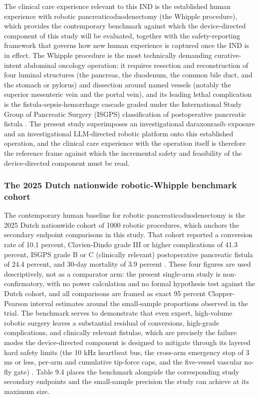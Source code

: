 The clinical care experience relevant to this IND is the established human
experience with robotic pancreaticoduodenectomy (the Whipple procedure), which
provides the contemporary benchmark against which the device-directed component of
this study will be evaluated, together with the safety-reporting framework that
governs how new human experience is captured once the IND is in effect. The
Whipple procedure is the most technically demanding curative-intent abdominal
oncology operation: it requires resection and reconstruction of four luminal
structures (the pancreas, the duodenum, the common bile duct, and the stomach or
pylorus) and dissection around named vessels (notably the superior mesenteric vein
and the portal vein), and its leading lethal complication is the
fistula-sepsis-hemorrhage cascade graded under the International Study Group of
Pancreatic Surgery (ISGPS) classification of postoperative pancreatic fistula
\cite{onpremwhippl}. The present study superimposes an investigational
daraxonrasib exposure and an investigational LLM-directed robotic platform onto
this established operation, and the clinical care experience with the operation
itself is therefore the reference frame against which the incremental safety and
feasibility of the device-directed component must be read.

\subsubsection*{The 2025 Dutch nationwide robotic-Whipple benchmark cohort}

The contemporary human baseline for robotic pancreaticoduodenectomy is the 2025
Dutch nationwide cohort of 1000 robotic procedures, which anchors the secondary
endpoint comparisons in this study. That cohort reported a conversion rate of 10.1
percent, Clavien-Dindo grade III or higher complications of 41.3 percent, ISGPS
grade B or C (clinically relevant) postoperative pancreatic fistula of 24.4
percent, and 30-day mortality of 3.9 percent \cite{onpremwhippl}. These four
figures are used descriptively, not as a comparator arm: the present single-arm
study is non-confirmatory, with no power calculation and no formal hypothesis test
against the Dutch cohort, and all comparisons are framed as exact 95 percent
Clopper-Pearson interval estimates around the small-sample proportions observed in
the trial. The benchmark serves to demonstrate that even expert, high-volume
robotic surgery leaves a substantial residual of conversions, high-grade
complications, and clinically relevant fistulae, which are precisely the failure
modes the device-directed component is designed to mitigate through its layered
hard safety limits (the 10 kHz heartbeat bus, the cross-arm emergency stop of 3 ms
or less, per-arm and cumulative tip-force caps, and the five-vessel vascular no-fly
gate) \cite{daraxwhipple}. Table 9.4 places the benchmark alongside the
corresponding study secondary endpoints and the small-sample precision the study
can achieve at its maximum size.

